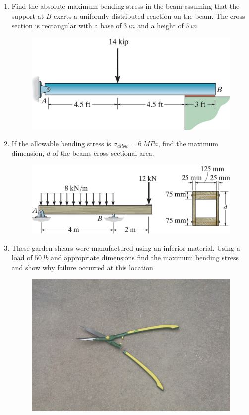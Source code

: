 \documentclass[12pt, oneside]{article}
\let\US\SI
\begin{document}
\begin{enumerate}
\begin{figure}[H]
		\end{figure}
	\item %
		Find the absolute maximum bending stress in the beam assuming that the support at $B$ exerts a uniformly distributed reaction on the beam.
		The cross section is rectangular with a base of $\US{3}{in}$ and a height of $\US{5}{in}$
		\begin{figure}[H]
			\centering
			\includegraphics[width=0.6\linewidth]{6-93}
		\end{figure}
		\newpage
	\item %
		If the allowable bending stress is $\sigma_{allow} = \SI{6}{MPa}$, find the maximum dimension, $d$ of the beams cross sectional area.
		\begin{figure}[H]
			\centering
			\includegraphics[width=0.8\linewidth]{6-101}
		\end{figure}
	\item %
		These garden shears were manufactured using an inferior material.
		Using a load of $\US{50}{lb}$ and appropriate dimensions find the maximum bending stress and show why failure occurred at this location
		\begin{figure}[H]
			\centering
			\includegraphics[width=0.7\linewidth]{c6-4a}

\end{figure}
\end{enumerate}
\end{document}

